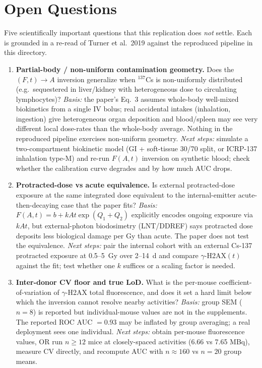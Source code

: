 \section{Open Questions}
\label{sec:open}

Five scientifically important questions that this replication does
\emph{not} settle. Each is grounded in a re-read of Turner et al.\ 2019
against the reproduced pipeline in this directory.

\begin{enumerate}
\item \textbf{Partial-body / non-uniform contamination geometry.}
Does the $(F,t)\!\to\!A$ inversion generalize when $^{137}$Cs is
non-uniformly distributed (e.g.\ sequestered in liver/kidney with
heterogeneous dose to circulating lymphocytes)?
\emph{Basis:} the paper's Eq.~3 assumes whole-body well-mixed
biokinetics from a single IV bolus; real accidental intakes
(inhalation, ingestion) give heterogeneous organ deposition and
blood/spleen may see very different local dose-rates than the
whole-body average. Nothing in the reproduced pipeline exercises
non-uniform geometry.
\emph{Next steps:} simulate a two-compartment biokinetic model
(GI + soft-tissue 30/70 split, or ICRP-137 inhalation type-M) and
re-run $F(A,t)$ inversion on synthetic blood; check whether the
calibration curve degrades and by how much AUC drops.

\item \textbf{Protracted-dose vs acute equivalence.}
Is external protracted-dose exposure at the same integrated dose
equivalent to the internal-emitter acute-then-decaying case that the
paper fits?
\emph{Basis:} $F(A,t) = b + kAt\exp(Q_1{+}Q_2)$ explicitly encodes
ongoing exposure via $kAt$, but external-photon biodosimetry
(LNT/DDREF) says protracted dose deposits less biological damage per
Gy than acute. The paper does not test the equivalence.
\emph{Next steps:} pair the internal cohort with an external Cs-137
protracted exposure at 0.5--5~Gy over 2--14~d and compare
$\gamma$-H2AX$(t)$ against the fit; test whether one $k$ suffices or
a scaling factor is needed.

\item \textbf{Inter-donor CV floor and true LoD.}
What is the per-mouse coefficient-of-variation of $\gamma$-H2AX total
fluorescence, and does it set a hard limit below which the
inversion cannot resolve nearby activities?
\emph{Basis:} group SEM ($n{=}8$) is reported but individual-mouse
values are not in the supplements. The reported ROC AUC $=0.93$ may
be inflated by group averaging; a real deployment sees one individual.
\emph{Next steps:} obtain per-mouse fluorescence values, OR run
$n{\ge}12$ mice at closely-spaced activities (6.66 vs 7.65 MBq),
measure CV directly, and recompute AUC with $n\!\approx\!160$ vs
$n\!=\!20$ group means.


\end{enumerate}
